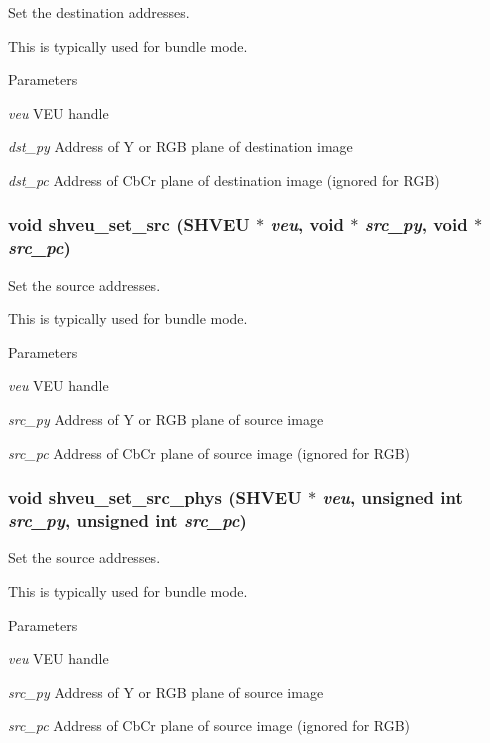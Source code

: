 Set the destination addresses. 

This is typically used for bundle mode. 
\begin{DoxyParams}{Parameters}
\item[{\em veu}]VEU handle \item[{\em dst\_\-py}]Address of Y or RGB plane of destination image \item[{\em dst\_\-pc}]Address of CbCr plane of destination image (ignored for RGB) \end{DoxyParams}
\subsubsection[{shveu\_\-set\_\-src}]{\setlength{\rightskip}{0pt plus 5cm}void shveu\_\-set\_\-src (SHVEU $\ast$ {\em veu}, \/  void $\ast$ {\em src\_\-py}, \/  void $\ast$ {\em src\_\-pc})}\label{veu__colorspace_8h_a49f0b29153ad3debce864fa4105fc3a2}


Set the source addresses. 

This is typically used for bundle mode. 
\begin{DoxyParams}{Parameters}
\item[{\em veu}]VEU handle \item[{\em src\_\-py}]Address of Y or RGB plane of source image \item[{\em src\_\-pc}]Address of CbCr plane of source image (ignored for RGB) \end{DoxyParams}
\subsubsection[{shveu\_\-set\_\-src\_\-phys}]{\setlength{\rightskip}{0pt plus 5cm}void shveu\_\-set\_\-src\_\-phys (SHVEU $\ast$ {\em veu}, \/  unsigned int {\em src\_\-py}, \/  unsigned int {\em src\_\-pc})}\label{veu__colorspace_8h_a9f0ea63b637240d8535d1be05a6a0822}


Set the source addresses. 

This is typically used for bundle mode. 
\begin{DoxyParams}{Parameters}
\item[{\em veu}]VEU handle \item[{\em src\_\-py}]Address of Y or RGB plane of source image \item[{\em src\_\-pc}]Address of CbCr plane of source image (ignored for RGB) \end{DoxyParams}
